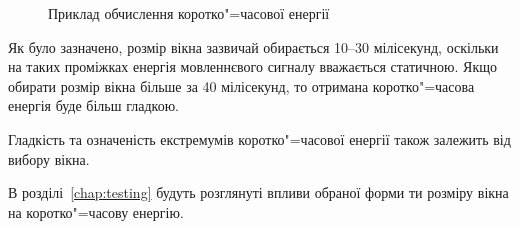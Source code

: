     \begin{figure}[h]
        \centering

        \caption{Приклад обчислення коротко"=часової енергії}
        \label{fig:ste-example}
    \end{figure}

    Як було зазначено, розмір вікна зазвичай обирається 10--30 мілісекунд, оскільки на таких проміжках енергія
    мовленнєвого сигналу вважається статичною.
    Якщо обирати розмір вікна більше за 40 мілісекунд, то отримана коротко"=часова енергія буде більш гладкою.

    Гладкість та означеність екстремумів коротко"=часової енергії також залежить від вибору вікна.

    В розділі~\ref{chap:testing} будуть розглянуті впливи обраної форми ти розміру вікна на коротко"=часову енергію.

